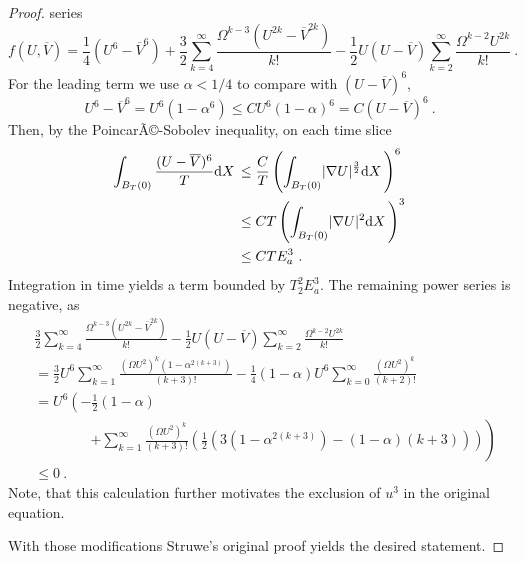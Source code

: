 \documentclass[a4paper]{amsart}
\providecommand{\abs}[1]{\lvert #1 \rvert}
\providecommand{\dint}[1]{ {\rm d} #1\,}
\begin{document}
\begin{proof}
  series
  \begin{equation*}
    f(U, \overline{V})
    =
    \frac{1}{4}
    \left(
      U^6 - \overline{V}^6
    \right)
    +
    \frac{3}{2} \sum_{k = 4}^\infty
    \frac{\Omega^{k - 3} (U^{2 k} - \overline{V}^{2 k})}{k!}
    -\frac{1}{2} U (U - \overline{V})
    \sum_{k = 2}^\infty
    \frac{\Omega^{k - 2} U^{2 k}}{k!} 
    \ .
  \end{equation*}
  For the leading term we use $\alpha < 1 / 4$ to compare
  with $(U - \overline{V})^6$, 
  \begin{equation*}
    U^6 - \overline{V}^6
    =
    U^6 (1 - \alpha^6)
    \leq
    C U^6 (1 - \alpha)^6
    =
    C (U - \overline{V})^6 \ .
  \end{equation*}
  Then, by the PoincarÃ©-Sobolev inequality, on each time slice
  \begin{equation*}
    \begin{split}
      \int_{B_T(0)} \frac{(U - \overline{V})^6}{T} \dint{X}
      &\leq
      \frac{C}{T}
      \left(
        \int_{B_T(0)} \abs{\nabla U}^{\frac{3}{2}} \dint{X}
      \right)^{6}
      \\
      &\leq
      C T
      \left(
        \int_{B_T(0)} \abs{\nabla U}^2 \dint{X}
      \right)^3
      \\
      &\leq
      C T E_a^3 \ .
    \end{split}
  \end{equation*}
  Integration in time yields a term bounded by $T_2^2 E_a^3$.
  The remaining power series is negative, as
  \begin{equation*}
    \begin{split}
      &\frac{3}{2} \sum_{k = 4}^\infty
      \frac{\Omega^{k - 3} (U^{2 k} - \overline{V}^{2 k})}{k!}
      -\frac{1}{2} U (U - \overline{V})
      \sum_{k = 2}^\infty
      \frac{\Omega^{k - 2} U^{2 k}}{k!} 
      \\
      &=
      \frac{3}{2} U^6
      \sum_{k = 1}^\infty
      \frac{(\Omega U^2)^k (1 - \alpha^{2 (k + 3)})}{(k + 3)!}
      -
      \frac{1}{4} (1 - \alpha) U^6
      \sum_{k = 0}^\infty
      \frac{(\Omega U^2)^k}{(k + 2)!} 
      \\
      &=
      U^6 
      \left(
        -
        \frac{1}{2} (1 - \alpha)
      \right.
      \\
      &\qquad \qquad
      \left.
        +
        \sum_{k = 1}^\infty 
        \frac{(\Omega U^2)^k}{(k + 3)!}
        \left(
          \frac{1}{2}
          \left(
            3 (1 - \alpha^{2 (k + 3)})
            -
            (1 - \alpha) (k + 3)
          \right)
        \right)
      \right) 
      \\
      &\leq
      0
      \ .
    \end{split}
  \end{equation*}
  Note, that this calculation further motivates the exclusion of
  $u^3$ in the original equation.
  \par
  With those modifications Struwe's original proof yields the desired
  statement.
\end{proof}
\end{document}

